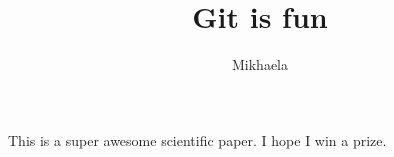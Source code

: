 \documentclass[10pt]{article}
\author{Mikhaela}
\title{Git is fun}
\begin{document}
	\maketitle

	This is a super awesome scientific paper.
	I hope I win a prize.
\end{document}

